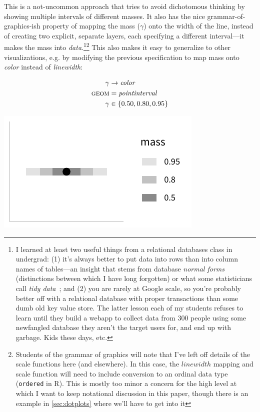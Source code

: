 \documentclass[journal]{vgtc}                     %
\begin{document}
This is a not-uncommon approach that tries to avoid dichotomous thinking by showing multiple intervals of different masses. It also has the nice grammar-of-graphics-ish property of mapping the mass ($\gamma$) onto the width of the line, instead of creating two explicit, separate layers, each specifying a different interval---it makes the mass into \textit{data}.\footnote{I learned at least two useful things from a relational databases class in undergrad: (1) it's always better to put data into rows than into column names of tables---an insight that stems from database \textit{normal forms}~\cite{codd1990relational} (distinctions between which I have long forgotten) or what some statisticians call \textit{tidy data}~\cite{hadley2014tidy}; and (2) you are rarely at Google scale, so you're probably better off with a relational database with proper transactions than some dumb old key value store. The latter lesson each of my students refuses to learn until they build a webapp to collect data from 300 people using some newfangled database they aren't the target users for, and end up with garbage. Kids these days, etc.}\footnote{Students of the grammar of graphics will note that I've left off details of the scale functions here (and elsewhere). In this case, the $linewidth$ mapping and scale function will need to include conversion to an ordinal data type (\texttt{ordered} in R). This is mostly too minor a concern for the high level at which I want to keep notational discussion in this paper, though there is an example in \cref{sec:dotplots} where we'll have to get into it} This also makes it easy to generalize to other visualizations, e.g. by modifying the previous specification to map mass onto \textit{color} instead of \textit{linewidth}:


\noindent
\begin{minipage}{.5\columnwidth}

\begin{align*}
\gamma &\rightarrow \mathit{color}\\
\textsc{geom} &= \mathit{pointinterval}\\
\gamma &\in \{0.50, 0.80, 0.95\}
\end{align*}
\end{minipage}%
  \begin{minipage}{.4\columnwidth}
    \centering
    \includegraphics[width=1.2\columnwidth]{figs/3-stat_pointinterval_color.pdf}
  \end{minipage}
\hfill\break
\end{document}
